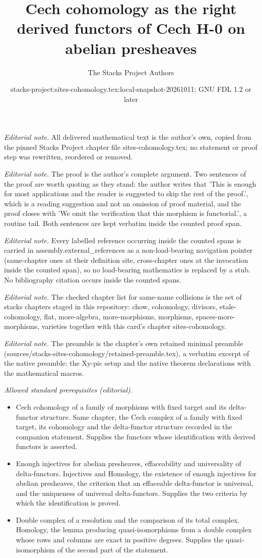 \documentclass[10pt,a4paper]{amsart}
\title{Cech cohomology as the right derived functors of Cech H-0 on abelian presheaves}
\author{The Stacks Project Authors}
\date{stacks-project:sites-cohomology.tex:local-snapshot-20261011; GNU FDL 1.2 or later}
\theoremstyle{plain}
\theoremstyle{definition}
\theoremstyle{remark}
\numberwithin{equation}{subsection}
\begin{document}
\maketitle
\noindent\textit{Editorial note.} All delivered mathematical text is the author's own, copied from the pinned Stacks Project chapter file sites-cohomology.tex; no statement or proof step was rewritten, reordered or removed.\par\medskip
\noindent\textit{Editorial note.} The proof is the author's complete argument. Two sentences of the proof are worth quoting as they stand: the author writes that 'This is enough for most applications and the reader is suggested to skip the rest of the proof.', which is a reading suggestion and not an omission of proof material, and the proof closes with 'We omit the verification that this morphism is functorial.', a routine tail. Both sentences are kept verbatim inside the counted proof span.\par\medskip
\noindent\textit{Editorial note.} Every labelled reference occurring inside the counted spans is carried in assembly.external\_references as a non-load-bearing navigation pointer (same-chapter ones at their definition site, cross-chapter ones at the invocation inside the counted span), so no load-bearing mathematics is replaced by a stub. No bibliography citation occurs inside the counted spans.\par\medskip
\noindent\textit{Editorial note.} The checked chapter list for same-name collisions is the set of stacks chapters staged in this repository: chow, cohomology, divisors, etale-cohomology, flat, more-algebra, more-morphisms, morphisms, spaces-more-morphisms, varieties together with this card's chapter sites-cohomology.\par\medskip
\noindent\textit{Editorial note.} The preamble is the chapter's own retained minimal preamble (sources/stacks-sites-cohomology/retained-preamble.tex), a verbatim excerpt of the native preamble: the Xy-pic setup and the native theorem declarations with the mathematical macros.\par\medskip
\noindent\textit{Allowed standard prerequisites (editorial).}\begin{itemize}
\item Cech cohomology of a family of morphisms with fixed target and its delta-functor structure. Same chapter, the Cech complex of a family with fixed target, its cohomology and the delta-functor structure recorded in the companion statement. Supplies the functors whose identification with derived functors is asserted.
\item Enough injectives for abelian presheaves, effaceability and universality of delta-functors. Injectives and Homology, the existence of enough injectives for abelian presheaves, the criterion that an effaceable delta-functor is universal, and the uniqueness of universal delta-functors. Supplies the two criteria by which the identification is proved.
\item Double complex of a resolution and the comparison of its total complex. Homology, the lemma producing quasi-isomorphisms from a double complex whose rows and columns are exact in positive degrees. Supplies the quasi-isomorphism of the second part of the statement.
\end{itemize}\medskip
\end{document}
